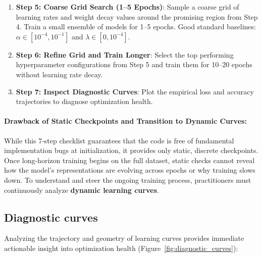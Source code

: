 \begin{enumerate}[leftmargin=*]
  \item \textbf{Step 5: Coarse Grid Search (1--5 Epochs)}:
    Sample a coarse grid of learning rates and weight decay values around the promising region from Step 4. Train a small ensemble of models for 1--5 epochs. Good standard baselines: $\alpha \in [10^{-4}, 10^{-1}]$ and $\lambda \in [0, 10^{-4}]$.
  \item \textbf{Step 6: Refine Grid and Train Longer}:
    Select the top performing hyperparameter configurations from Step 5 and train them for 10--20 epochs without learning rate decay.
  \item \textbf{Step 7: Inspect Diagnostic Curves}:
    Plot the empirical loss and accuracy trajectories to diagnose optimization health.
\end{enumerate}

\paragraph{Drawback of Static Checkpoints and Transition to Dynamic Curves:}
While this 7-step checklist guarantees that the code is free of fundamental implementation bugs at initialization, it provides only static, discrete checkpoints. Once long-horizon training begins on the full dataset, static checks cannot reveal how the model's representations are evolving across epochs or why training slows down. To understand and steer the ongoing training process, practitioners must continuously analyze \textbf{dynamic learning curves}.

\subsection{Diagnostic curves}
\label{sec:diagnostic_curves}

Analyzing the trajectory and geometry of learning curves provides immediate actionable insight into optimization health (Figure~\ref{fig:diagnostic_curves}):

